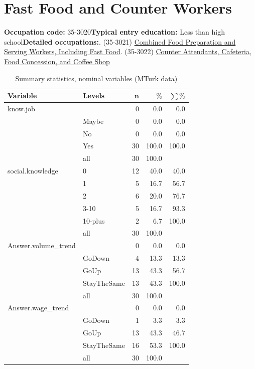 \documentclass[a4paper,10pt]{article}\usepackage[]{graphicx}\usepackage[]{color}
\begin{document}
\newpage\section{Fast Food and Counter Workers}\textbf{Occupation code:} 35-3020\newline\textbf{Typical entry education:} Less than high school\newline\textbf{Detailed occupations:}. (35-3021)  \href{http://www.bls.gov/oes/current/oes353021.htm}{Combined Food Preparation and Serving Workers, Including Fast Food}. (35-3022)  \href{http://www.bls.gov/oes/current/oes353022.htm}{Counter Attendants, Cafeteria, Food Concession, and Coffee Shop}\newline%
\begin{table}[ht]
\centering
{\footnotesize
\begin{tabular}{ll|rrr}
 \textbf{Variable} & \textbf{Levels} & $\mathbf{n}$ & $\mathbf{\%}$ & $\mathbf{\sum \%}$ \\ 
  \hline
know.job &  & 0 & 0.0 & 0.0 \\ 
   & Maybe & 0 & 0.0 & 0.0 \\ 
   & No & 0 & 0.0 & 0.0 \\ 
   & Yes & 30 & 100.0 & 100.0 \\ 
   \hline
 & all & 30 & 100.0 &  \\ 
   \hline
\hline
social.knowledge & 0 & 12 & 40.0 & 40.0 \\ 
   & 1 & 5 & 16.7 & 56.7 \\ 
   & 2 & 6 & 20.0 & 76.7 \\ 
   & 3-10 & 5 & 16.7 & 93.3 \\ 
   & 10-plus & 2 & 6.7 & 100.0 \\ 
   \hline
 & all & 30 & 100.0 &  \\ 
   \hline
\hline
Answer.volume\_trend &  & 0 & 0.0 & 0.0 \\ 
   & GoDown & 4 & 13.3 & 13.3 \\ 
   & GoUp & 13 & 43.3 & 56.7 \\ 
   & StayTheSame & 13 & 43.3 & 100.0 \\ 
   \hline
 & all & 30 & 100.0 &  \\ 
   \hline
\hline
Answer.wage\_trend &  & 0 & 0.0 & 0.0 \\ 
   & GoDown & 1 & 3.3 & 3.3 \\ 
   & GoUp & 13 & 43.3 & 46.7 \\ 
   & StayTheSame & 16 & 53.3 & 100.0 \\ 
   \hline
 & all & 30 & 100.0 &  \\ 
   \hline
\hline
\end{tabular}
}
\caption{Summary statistics, nominal variables (MTurk data)} 
\label{tab1:35-3020}
\end{table}
\end{document}
